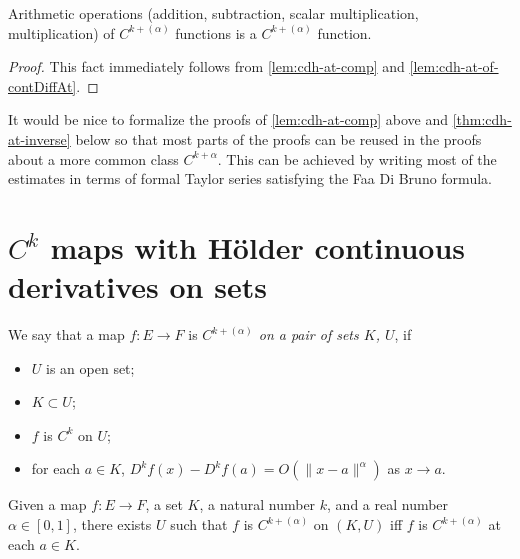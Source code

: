 \begin{corollary}%
  \label{cor:cdh-at-arith}
  Arithmetic operations (addition, subtraction, scalar multiplication, multiplication)
  of \(C^{k+(\alpha)}\) functions is a \(C^{k+(\alpha)}\) function.
\end{corollary}

\begin{proof}
  This fact immediately follows
  from \autoref{lem:cdh-at-comp} and \autoref{lem:cdh-at-of-contDiffAt}.
\end{proof}

\begin{remark}
  It would be nice to formalize the proofs of \autoref{lem:cdh-at-comp} above
  and \autoref{thm:cdh-at-inverse} below
  so that most parts of the proofs
  can be reused in the proofs about a more common class \(C^{k+\alpha}\).
  This can be achieved by writing most of the estimates
  in terms of formal Taylor series satisfying the Faa Di Bruno formula.
\end{remark}

\section{\(C^{k}\) maps with Hölder continuous derivatives on sets}%
\label{sec:chd-on}

\begin{definition}%
  \label{def:cdh-on}
  \leanok%
  We say that a map \(f\colon E\to F\) is \emph{\(C^{k+(\alpha)}\) on a pair of sets \(K\), \(U\)}, if
  \begin{itemize}
  \item \(U\) is an open set;
  \item \(K \subset U\);
  \item \(f\) is \(C^{k}\) on \(U\);
  \item for each \(a \in K\), \(D^{k}f(x) - D^{k}f(a) = O(\|x - a\|^{\alpha})\) as \(x\to a\).
  \end{itemize}
\end{definition}

\begin{lemma}%
  \label{lem:exists-cdh-on}
  \leanok%
  Given a map \(f\colon E \to F\), a set \(K\), a natural number \(k\), and a real number \(\alpha \in [0, 1]\),
  there exists \(U\) such that \(f\) is \(C^{k+(\alpha)}\) on \((K, U)\)
  iff \(f\) is \(C^{k+(\alpha)}\) at each \(a \in K\).
\end{lemma}

